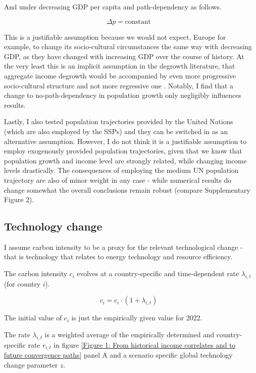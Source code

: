 \documentclass{article}
\begin{document}
And under decreasing GDP per capita and path-dependency as follows.

\begin{equation}
\Delta{p} = \text{constant}
\end{equation}

This is a justifiable assumption because we would not expect, Europe for example, to change its socio-cultural circumstances the same way with decreasing GDP, as they have changed with increasing GDP over the course of history. At the very least this is an implicit assumption in the degrowth literature, that aggregate income degrowth would be accompanied by even more progressive socio-cultural structure and not more regressive one \parencite{buchs2019challenges, hickel2020less}. Notably, I find that a change to no-path-dependency in population growth only negligibly influences results.

Lastly, I also tested population trajectories provided by the United Nations (which are also employed by the SSPs) and they can be switched in as an alternative assumption. However, I do not think it is a justifiable assumption to employ exogenously provided population trajectories, given that we know that population growth and income level are strongly related, while changing income levels drastically. The consequences of employing the medium UN population trajectory are also of minor weight in any case - while numerical results do change somewhat the overall conclusions remain robust (compare Supplementary Figure 2).

\subsection{Technology change}\label{Technology change}

I assume carbon intensity to be a proxy for the relevant technological change - that is technology that relates to energy technology and resource efficiency.

The carbon intensity \(c_i\) evolves at a country-specific and time-dependent rate \(\lambda_{i,t}\) (for country \(i\)).

\begin{equation}
c_i = c_i \cdot (1 + \lambda_{i,t})
\end{equation}

The initial value of \(c_i\) is just the empirically given value for 2022.

The rate \(\lambda_{i,t}\) is a weighted average of the empirically determined and country-specific rate \(r_{i,t}\) in figure \ref{Figure 1: From historical income correlates and to future convergence paths} panel A and a scenario specific global technology change parameter \(z\).
\end{document}

